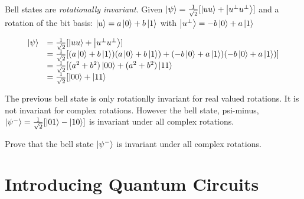 Bell states are \textit{rotationally invariant}.
Given $\left|\psi\right\rangle = \frac{1}{\sqrt{2}} [\left|uu\right\rangle + \left|u^{\perp}u^{\perp}\right\rangle]$ 
and a rotation of the bit basis:
$\left|u\right\rangle = a\left|0\right\rangle + b\left|1\right\rangle$ with $\left|u^{\perp}\right\rangle = -b\left|0\right\rangle + a\left|1\right\rangle$




\[ \begin{array}{ll}
\left|\psi\right\rangle
& =
\frac{1}{\sqrt{2}} [\left|uu\right\rangle + \left|u^{\perp}u^{\perp}\right\rangle] \\
& =
\frac{1}{\sqrt{2}} [(a\left|0\right\rangle + b\left|1\right\rangle)(a\left|0\right\rangle + b\left|1\right\rangle) 
+ (-b\left|0\right\rangle + a\left|1\right\rangle)(-b\left|0\right\rangle + a\left|1\right\rangle)]  \\ 
& =
\frac{1}{\sqrt{2}} [(a^2 + b^2)\left|00\right\rangle + (a^2 + b^2)\left|11\right\rangle \\ 
& =
\frac{1}{\sqrt{2}} [\left|00\right\rangle + \left|11\right\rangle \\ 
\end{array}\] 

\frmrule

The previous bell state is only rotationlly invariant for real valued rotations. 
It is not invariant for complex rotations. However the bell state, 
psi-minus, $\left|\psi^{-}\right\rangle = \frac{1}{\sqrt{2}} [\left|01\right\rangle - \left|10\right\rangle]$
is invariant under all complex rotations.

\begin{example}
Prove that the bell state $\left|\psi^{-}\right\rangle$ is invariant under all complex rotations.
\end{example}




\section{Introducing Quantum Circuits}



